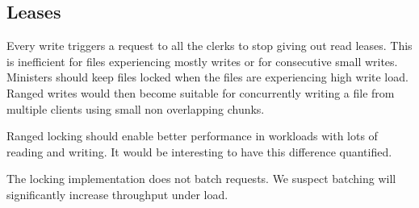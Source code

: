\subsection{Leases}
Every write triggers a request to all the clerks to stop giving out read leases. This is inefficient for files experiencing mostly writes or for consecutive small writes. Ministers should keep files locked when the files are experiencing high write load. Ranged writes would then become suitable for concurrently writing a file from multiple clients using small non overlapping chunks.

Ranged locking should enable better performance in workloads with lots of reading and writing. It would be interesting to have this difference quantified.

The locking implementation does not batch requests. We suspect batching will significantly increase throughput under load.
